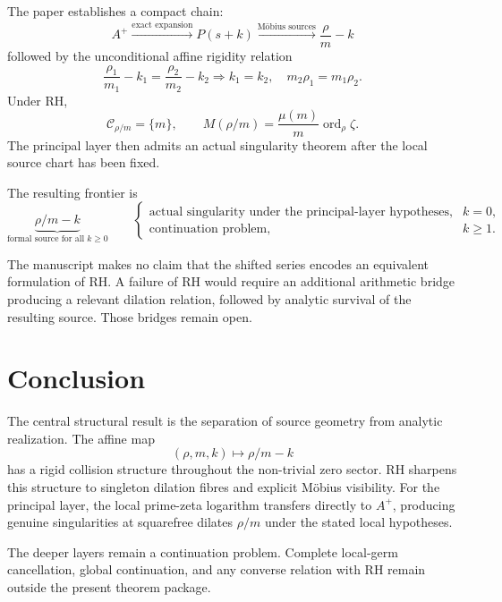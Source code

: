 \documentclass[11pt,a4paper]{article}
\theoremstyle{remark}
\newcommand{\ord}{\operatorname{ord}}
\begin{document}
The paper establishes a compact chain:
\[
\boxed{
A^+
\xrightarrow{\text{exact expansion}}
P(s+k)
\xrightarrow{\text{Möbius sources}}
\frac{\rho}{m}-k
}
\]
followed by the unconditional affine rigidity relation
\[
\boxed{
\frac{\rho_1}{m_1}-k_1=\frac{\rho_2}{m_2}-k_2
\Longrightarrow
k_1=k_2,\quad m_2\rho_1=m_1\rho_2.
}
\]
Under RH,
\[
\boxed{
\mathcal C_{\rho/m}=\{m\},\qquad
M(\rho/m)=\frac{\mu(m)}m\ord_\rho\zeta.
}
\]
The principal layer then admits an actual singularity theorem after the local source chart has been fixed.

The resulting frontier is
\[
\boxed{
\underbrace{\rho/m-k}_{\text{formal source for all }k\ge0}
\qquad
\begin{cases}
\text{actual singularity under the principal-layer hypotheses},&k=0,\\
\text{continuation problem},&k\ge1.
\end{cases}}
\]

The manuscript makes no claim that the shifted series encodes an equivalent formulation of RH. A failure of RH would require an additional arithmetic bridge producing a relevant dilation relation, followed by analytic survival of the resulting source. Those bridges remain open.

\section{Conclusion}

The central structural result is the separation of source geometry from analytic realization. The affine map
\[
(\rho,m,k)\mapsto \rho/m-k
\]
has a rigid collision structure throughout the non-trivial zero sector. RH sharpens this structure to singleton dilation fibres and explicit Möbius visibility. For the principal layer, the local prime-zeta logarithm transfers directly to $A^+$, producing genuine singularities at squarefree dilates $\rho/m$ under the stated local hypotheses.

The deeper layers remain a continuation problem. Complete local-germ cancellation, global continuation, and any converse relation with RH remain outside the present theorem package.
\end{document}
